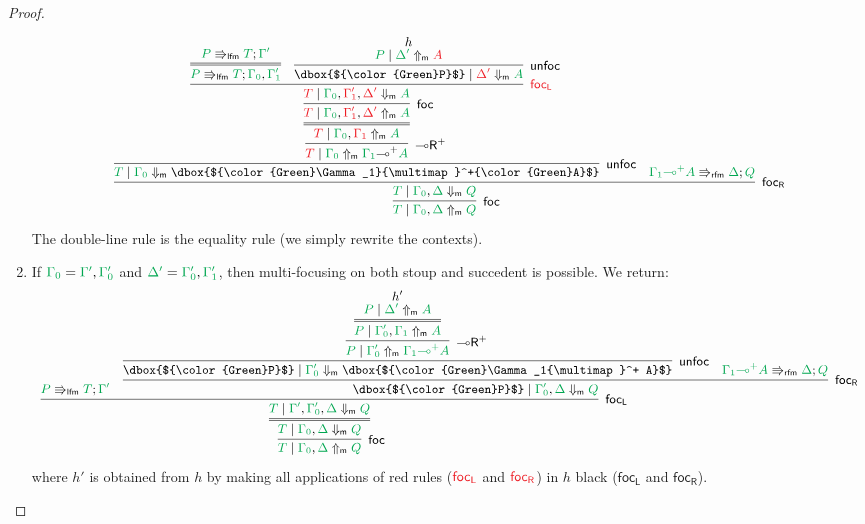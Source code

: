 \documentclass[runningheads]{llncs}
\newcommand{\lright}{{\multimap}\mathsf{R}}
\newcommand{\lolliR}{\lright}
\newcommand{\lolli}{\multimap}
\newcommand{\lfm}{\Rrightarrow_\mathsf{lfm}}
\newcommand{\rfm}{\Rrightarrow_\mathsf{rfm}}
\newcommand{\red}[1]{{\color{Red}#1}}
\newcommand{\green}[1]{{\color{Green}#1}}
\newcommand{\upm}{\Uparrow_{\mathsf{m}}}
\newcommand{\dnm}{\Downarrow_{\mathsf{m}}}
\newcommand{\focL}{\mathsf{foc_L}}
\newcommand{\foc}{\mathsf{foc}}
\newcommand{\focR}{\mathsf{foc_R}}
\newcommand{\unfoc}{\mathsf{unfoc}}
\begin{document}
\begin{proof}
\begin{enumerate}
    \[\small
    \infer[\foc]{\green{T} \mid \green{\Gamma_0},\green{\Delta} \upm \green{Q}}{
      \infer[\focR]{\green{T} \mid \green{\Gamma_0},\green{\Delta} \dnm \green{Q}}{
        \infer[\unfoc]{\green{T} \mid \green{\Gamma_0} \dnm \dbox{$\green{\Gamma_1}{\lolli}^+\green{A}$}}{
          \infer[\lolliR^+]{\red{T} \mid \green{\Gamma_0} \upm \green{\Gamma_1}{\lolli}^+\green{A}}{
            \infer={\red{T} \mid \green{\Gamma_0},\red{\Gamma_1} \upm \green{A}}{
              \infer[\foc]{\red{T} \mid \green{\Gamma_0},\red{\Gamma'_1},\red{\Delta'}\upm \green{A}}{
                \infer[\red{\focL}]{\red{T} \mid \green{\Gamma_0},\red{\Gamma'_1},\red{\Delta'} \dnm \green{A}}{
                  \infer={\green{P} \lfm \green{T} ; \green{\Gamma_0},\green{\Gamma'_1}}{
                    \green{P} \lfm \green{T} ; \green{\Gamma'}
                  }
                  &
                  \infer[\unfoc]{\dbox{$\green{P}$} \mid \red{\Delta'} \dnm \green{A}}{
                    \deduce{\green{P} \mid \green{\Delta'} \upm \red{A}}{h}
                  }
                }
              }
            }            
          }
        }
        &
        \green{\green{\Gamma_1}{\lolli}^+ A} \rfm \green{\Delta} ; \green{Q}
      }
    }
    \]
    The double-line rule is the equality rule (we simply rewrite the contexts).    
  \item If $\green{\Gamma_0} = \green{\Gamma'},\green{\Gamma_{0}'}$ and $\green{\Delta'} = \green{\Gamma_{0}'},\green{\Gamma_{1}'}$, then multi-focusing on both stoup and succedent is possible. We return:
    \[\small
    \infer[\foc]{\green{T} \mid \green{\Gamma_0},\green{\Delta} \upm \green{Q}}{
      \infer={\green{T} \mid \green{\Gamma_0} ,\green{\Delta} \dnm \green{Q}}{
        \infer[\focL]{\green{T} \mid \green{\Gamma'},\green{\Gamma_{0}'},\green{\Delta} \dnm \green{Q}}{
          \green{P} \lfm \green{T} ; \green{\Gamma'}
          &
          \infer[\focR]{\dbox{$\green{P}$} \mid \green{\Gamma_{0}'},\green{\Delta} \dnm \green{Q}}{
            \infer[\unfoc]{\dbox{$\green{P}$} \mid \green{\Gamma_{0}'} \dnm \dbox{$\green{\Gamma_1{\lolli}^+ A}$}}{
              \infer[\lolliR^+]{\green{P} \mid \green{\Gamma_{0}'} \upm \green{\Gamma_1{\lolli}^+ A}}{
                \infer={\green{P} \mid \green{\Gamma_{0}'}, \green{\Gamma_1}\upm \green{A}}{
                \deduce{\green{P} \mid \green{\Delta'}\upm \green{A}}{h'}
                }
              }
            }
            &
            \green{\green{\Gamma_1}{\lolli}^+ A} \rfm \green{\Delta} ; \green{Q}
          }
        }
      }
    }
    \]
where $h'$ is obtained from $h$ by making all applications of red rules ($\red{\focL}$ and $\red{\focR}$) in $h$ black ($\focL$ and $\focR$).
  \end{enumerate}
\end{proof}
\end{document}
